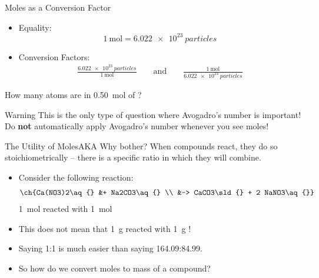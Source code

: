 \documentclass[10pt,letterpaper]{article}
\begin{document}
\begin{frame}{Moles as a Conversion Factor}
	\begin{itemize}
		\item Equality:
			\begin{equation*}
				\SI{1}{\mole} = \SI{6.022e23}{particles}
			\end{equation*}
		\item Conversion Factors:
			\begin{align*}
				\frac{\SI{6.022e23}{particles}}{\SI{1}{\mole}}
				\qquad\text{and}\qquad
				\frac{\SI{1}{\mole}}{\SI{6.022e23}{particles}}
			\end{align*}
	\end{itemize}

	\pause
	\bigskip

	How many  atoms are in \SI{0.50}{\mole} of ?


	\bigskip

	\begin{alertblock}{Warning}
		This is the only type of question where Avogadro's number is
		important! Do \textbf{not} automatically apply Avogadro's number
		whenever you see moles!
	\end{alertblock}
\end{frame}


\begin{frame}{The Utility of Moles}{AKA Why bother?}
	When compounds react, they do so \alert{stoichiometrically}
		-- there is a specific ratio in which they will combine.
		\begin{itemize}[<+(1)->]
			\item Consider the following reaction: %
				\begin{align*}
					\ch{Ca(NO3)2\aq{} &+ Na2CO3\aq{} \\ 
					&->
					CaCO3\sld{} + 2 NaNO3\aq{}}
				\end{align*}
				\alert{\SI{1}{\mole}} 
				reacted with \alert{\SI{1}{\mole}}
			\item This \alert{does not} mean that \SI{1}{\gram}
				 reacted with \SI{1}{\gram}
				!
			\item Saying 1:1 is much easier than saying
				164.09:84.99.
			\item So how do we convert moles to mass of a compound?
		\end{itemize}
\end{frame}
\end{document}

